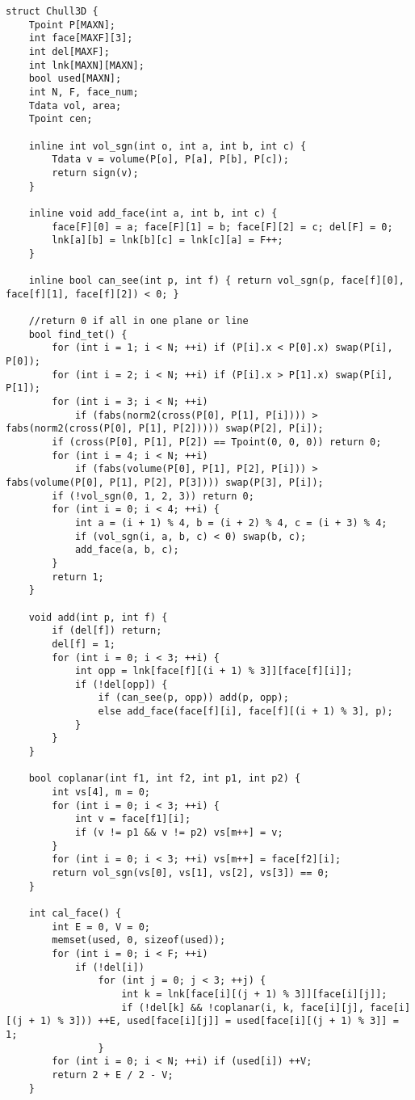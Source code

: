 \begin{verbatim}
struct Chull3D {
    Tpoint P[MAXN];
    int face[MAXF][3];
    int del[MAXF];
    int lnk[MAXN][MAXN];
    bool used[MAXN];
    int N, F, face_num;
    Tdata vol, area;
    Tpoint cen;

    inline int vol_sgn(int o, int a, int b, int c) {
        Tdata v = volume(P[o], P[a], P[b], P[c]);
        return sign(v);
    }

    inline void add_face(int a, int b, int c) {
        face[F][0] = a; face[F][1] = b; face[F][2] = c; del[F] = 0;
        lnk[a][b] = lnk[b][c] = lnk[c][a] = F++;
    }

    inline bool can_see(int p, int f) { return vol_sgn(p, face[f][0], face[f][1], face[f][2]) < 0; }

    //return 0 if all in one plane or line
    bool find_tet() {
        for (int i = 1; i < N; ++i) if (P[i].x < P[0].x) swap(P[i], P[0]);
        for (int i = 2; i < N; ++i) if (P[i].x > P[1].x) swap(P[i], P[1]);
        for (int i = 3; i < N; ++i)
            if (fabs(norm2(cross(P[0], P[1], P[i]))) > fabs(norm2(cross(P[0], P[1], P[2])))) swap(P[2], P[i]);
        if (cross(P[0], P[1], P[2]) == Tpoint(0, 0, 0)) return 0;
        for (int i = 4; i < N; ++i)
            if (fabs(volume(P[0], P[1], P[2], P[i])) > fabs(volume(P[0], P[1], P[2], P[3]))) swap(P[3], P[i]);
        if (!vol_sgn(0, 1, 2, 3)) return 0;
        for (int i = 0; i < 4; ++i) {
            int a = (i + 1) % 4, b = (i + 2) % 4, c = (i + 3) % 4;
            if (vol_sgn(i, a, b, c) < 0) swap(b, c);
            add_face(a, b, c);
        }
        return 1;
    }

    void add(int p, int f) {
        if (del[f]) return;
        del[f] = 1;
        for (int i = 0; i < 3; ++i) {
            int opp = lnk[face[f][(i + 1) % 3]][face[f][i]];
            if (!del[opp]) {
                if (can_see(p, opp)) add(p, opp);
                else add_face(face[f][i], face[f][(i + 1) % 3], p);
            }
        }
    }

    bool coplanar(int f1, int f2, int p1, int p2) {
        int vs[4], m = 0;
        for (int i = 0; i < 3; ++i) {
            int v = face[f1][i];
            if (v != p1 && v != p2) vs[m++] = v;
        }
        for (int i = 0; i < 3; ++i) vs[m++] = face[f2][i];
        return vol_sgn(vs[0], vs[1], vs[2], vs[3]) == 0;
    }

    int cal_face() {
        int E = 0, V = 0;
        memset(used, 0, sizeof(used));
        for (int i = 0; i < F; ++i)
            if (!del[i])
                for (int j = 0; j < 3; ++j) {
                    int k = lnk[face[i][(j + 1) % 3]][face[i][j]];
                    if (!del[k] && !coplanar(i, k, face[i][j], face[i][(j + 1) % 3])) ++E, used[face[i][j]] = used[face[i][(j + 1) % 3]] = 1;
                }
        for (int i = 0; i < N; ++i) if (used[i]) ++V;
        return 2 + E / 2 - V;
    }


\end{verbatim}
